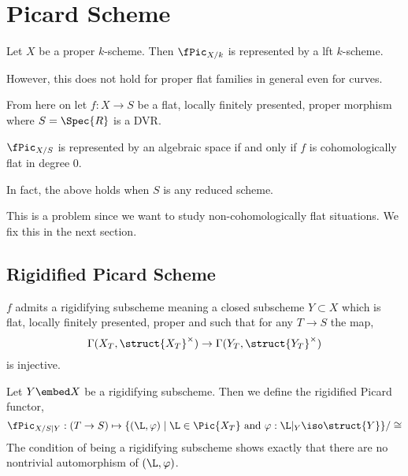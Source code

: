 \documentclass[12pt]{article}
\begin{document}
\section{Picard Scheme}

\begin{theorem}
Let $X$ be a proper $k$-scheme. Then $\fPic_{X/k}$ is represented by a lft $k$-scheme. 
\end{theorem}

\begin{rmk}
However, this does not hold for proper flat families in general even for curves. 
\end{rmk}

From here on let $f : X \to S$ be a flat, locally finitely presented, proper morphism where $S = \Spec{R}$ is a DVR. 

\begin{theorem}[8.3.2]
$\fPic_{X/S}$ is represented by an algebraic space if and only if $f$ is cohomologically flat in degree $0$.
\end{theorem}

\begin{rmk}
In fact, the above holds when $S$ is any reduced scheme.
\end{rmk}

This is a problem since we want to study non-cohomologically flat situations. We fix this in the next section.

\subsection{Rigidified Picard Scheme}

\begin{prop}[8.1.6]
$f$ admits a rigidifying subscheme meaning a closed subscheme $Y \subset X$ which is flat, locally finitely presented, proper and such that for any $T \to S$ the map,
\[ \Gamma(X_T, \struct{X_T}^\times) \to \Gamma(Y_T, \struct{Y_T}^\times) \]
is injective.  
\end{prop}


\begin{defn}
Let $Y \embed X$ be a rigidifying subscheme. Then we define the rigidified Picard  functor,
\[ \fPic_{X/S|Y} : (T \to S) \mapsto \{ (\L, \varphi) \mid \L \in \Pic{X_T} \text{ and } \varphi : \L|_Y \iso \struct{Y} \} / \cong \]
The condition of being a rigidifying subscheme shows exactly that there are no nontrivial automorphism of $(\L, \varphi)$. 
\end{defn}
\end{document}
